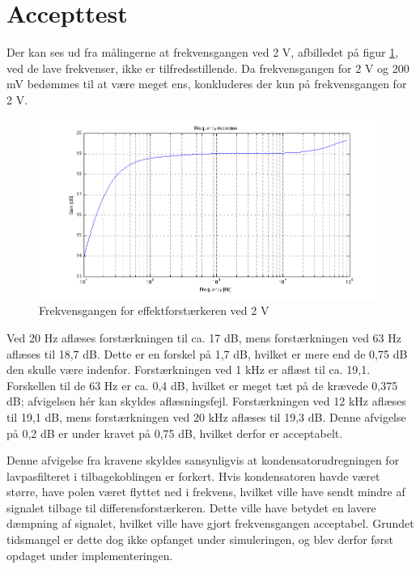 \section{Accepttest}
Der kan ses ud fra målingerne at frekvensgangen ved 2 V, afbilledet på figur \ref{fig:acceff:frek2v}, ved de lave frekvenser, ikke er tilfredsstillende. Da frekvensgangen for 2 V og 200 mV bedømmes til at være meget ens, konkluderes der kun på frekvensgangen for 2 V.

\begin{figure}[h]
\centering
\includegraphics[width=\textwidth]{maalerapporter/effektforstaerker/2V-45mA-uden-modstand-frek.png}
\caption{Frekvensgangen for effektforstærkeren ved 2 V}
\label{fig:acceff:frek2v}
\end{figure}

Ved 20 Hz aflæses forstærkningen til ca. 17 dB, mens forstærkningen ved 63 Hz aflæses til 18,7 dB. Dette er en forskel på 1,7 dB, hvilket er mere end de 0,75 dB den skulle være indenfor. Forstærkningen ved 1 kHz er aflæst til ca. 19,1. Forskellen til de 63 Hz er ca. 0,4 dB, hvilket er meget tæt på de krævede 0,375 dB; afvigelsen hér kan skyldes aflæsningsfejl. Forstærkningen ved 12 kHz aflæses til 19,1 dB, mens forstærkningen ved 20 kHz aflæses til 19,3 dB. Denne afvigelse på 0,2 dB er under kravet på 0,75 dB, hvilket derfor er acceptabelt.

Denne afvigelse fra kravene skyldes sansynligvis at kondensatorudregningen for lavpasfilteret i tilbagekoblingen er forkert. Hvis kondensatoren havde været større, have polen været flyttet ned i frekvens, hvilket ville have sendt mindre af signalet tilbage til differensforstærkeren. Dette ville have betydet en lavere dæmpning af signalet, hvilket ville have gjort frekvensgangen acceptabel. Grundet tidsmangel er dette dog ikke opfanget under simuleringen, og blev derfor først opdaget under implementeringen.

